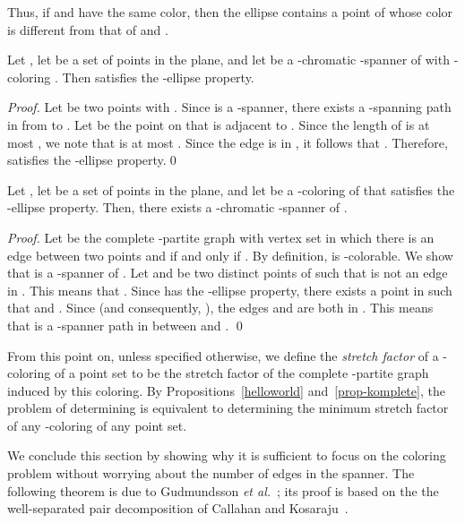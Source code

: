 \documentclass[pdftex,leqno,fleqn,12pts]{llncs}
\begin{document}
Thus, if  and  have the same color, then the ellipse 
 contains a point  of 
 whose color is different from that of  and .   

\begin{proposition}  \label{helloworld}  
Let , let  be a set of points in the plane, and let  be 
a -chromatic -spanner of  with -coloring . Then  
satisfies the -ellipse property.
\end{proposition}
\begin{proof}
Let  be two points with . Since  is a -spanner, there exists a -spanning
path  in  from  to . Let  be the point on  that is adjacent to . Since the length of  is at most , we note that  is at most . Since the edge 
is in , it follows that . Therefore,  satisfies the -ellipse property.\qed
\end{proof}

\begin{proposition}   \label{prop-komplete} 
Let , let  be a set of points in the plane, and let 
 be a -coloring of  that
satisfies the -ellipse property. Then, there exists a -chromatic
-spanner of .
\end{proposition}
\begin{proof}
Let  be the complete -partite graph with vertex set  
in which there is an edge between two points  and  if and only if
. By definition,  is -colorable. 
We show that  is a -spanner of . Let  and  be two 
distinct points of  such that  is not an edge in . 
This means that . Since  has the -ellipse property, 
there exists a point  in  such that  and 
. Since  (and consequently, 
), the edges  and  are both in . 
This means that  is a -spanner path in  between 
 and . 
\qed
\end{proof}

From this point on, unless specified otherwise, we define the \emph{stretch factor} of a -coloring of 
a point set to be the stretch factor of the complete -partite graph 
induced by this coloring. By Propositions~\ref{helloworld}
and~\ref{prop-komplete}, the problem of determining  is 
equivalent to determining the minimum stretch factor of any 
-coloring of any point set. 
 
We conclude this section by showing why it is sufficient to focus on 
the coloring problem without worrying about the number of edges in 
the spanner. The following theorem is due to 
Gudmundsson \emph{et al.}~\cite{glns-adogg-02}; its proof is based on 
the the well-separated pair decomposition of 
Callahan and Kosaraju~\cite{callahan95}. 
\end{document}
